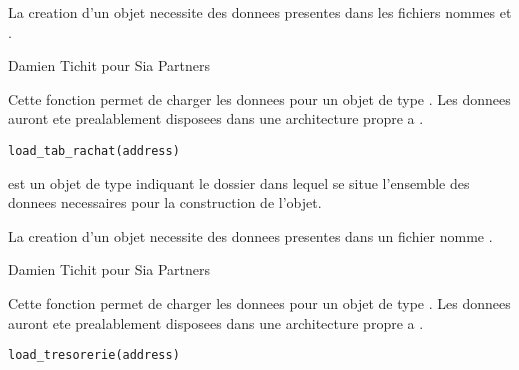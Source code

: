 \documentclass[a4paper]{book}
\begin{document}
%
\begin{Details}\relax
La creation d'un objet  necessite des donnees presentes dans les fichiers nommes  et .
\end{Details}
%
\begin{Author}\relax
Damien Tichit pour Sia Partners
\end{Author}
%
\begin{Description}\relax
Cette fonction permet de charger les donnees pour un objet de type . Les donnees auront ete prealablement disposees dans
une architecture propre a .
\end{Description}
%
\begin{Usage}
\begin{verbatim}
load_tab_rachat(address)
\end{verbatim}
\end{Usage}
%
\begin{Arguments}
\begin{ldescription}
\item[\code{address}] est un objet de type  indiquant le dossier dans lequel se situe l'ensemble des donnees necessaires
pour la construction de l'objet.
\end{ldescription}
\end{Arguments}
%
\begin{Details}\relax
La creation d'un objet  necessite des donnees presentes dans un fichier nomme .
\end{Details}
%
\begin{Author}\relax
Damien Tichit pour Sia Partners
\end{Author}
%
\begin{Description}\relax
Cette fonction permet de charger les donnees pour un objet de type . Les donnees auront ete prealablement disposees dans
une architecture propre a .
\end{Description}
%
\begin{Usage}
\begin{verbatim}
load_tresorerie(address)
\end{verbatim}
\end{Usage}
\end{document}

